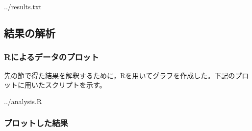 \documentclass[10pt,a4,uplatex]{jsarticle}
\begin{document}

{../results.txt}

\subsection{結果の解析}
\subsubsection{Rによるデータのプロット}
先の節で得た結果を解釈するために，Rを用いてグラフを作成した。下記のプロットに用いたスクリプトを示す。

{../analysis.R}

\subsubsection{プロットした結果}
\end{document}
